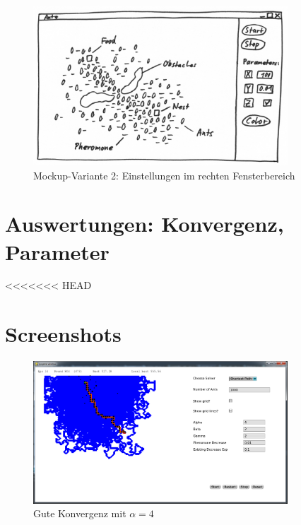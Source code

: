 \begin{figure}[h]
  \centering
	\includegraphics [width=0.85\textwidth]{images/Antz_Mockup_2_sw.png} 
	\caption{Mockup-Variante 2: Einstellungen im rechten Fensterbereich}
\end{figure}




\section{Auswertungen: Konvergenz, Parameter}

<<<<<<< HEAD
\section{Screenshots}

\begin{figure}[h]
  \centering
	\includegraphics [width=0.85\textwidth]{images/screenshots/good1.png} 
	\caption{Gute Konvergenz mit $\alpha = 4$}
\end{figure}

